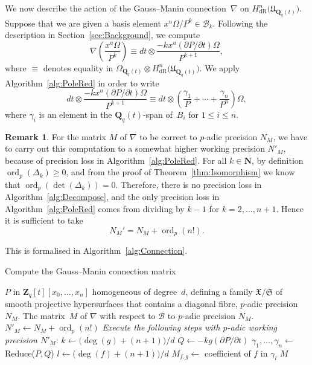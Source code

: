 \documentclass[a4paper,11pt]{article}
\numberwithin{equation}{section}
\newcommand{\NN}{\mathbf{N}} %
\newcommand{\ZZ}{\mathbf{Z}} %
\newcommand{\QQ}{\mathbf{Q}} %
\DeclareMathOperator{\ord}{ord}          %
\providecommand{\HdR}{H_{\text{dR}}}    %
\providecommand{\cB}{\mathcal{B}} %
\theoremstyle{definition}
\newtheorem{rem}[thm]{Remark}
\begin{document}
We now describe the action of the Gauss--Manin connection~$\nabla$ on 
$\HdR^n\bigl(\mathfrak{U}_{\QQ_q(t)}\bigr)$.  Suppose that we are given a basis element 
$x^u \Omega / P^k \in \cB_k$.  Following the description in 
Section~\ref{sec:Background}, we compute
\begin{equation} \label{eqn:nabla}
\nabla \left(\frac{x^u \Omega}{P^k}\right) \equiv 
    dt \otimes \frac{- k x^u (\partial P / \partial t) \Omega}{P^{k+1}},
\end{equation}
where $\equiv$ denotes equality in 
$\Omega_{\QQ_q(t)} \otimes \HdR^n\bigl(\mathfrak{U}_{\QQ_q(t)}\bigr)$. 
We apply Algorithm~\ref{alg:PoleRed} in order to write
\begin{equation}
dt \otimes \frac{- k x^u (\partial P / \partial t) \Omega}{P^{k+1}} \equiv 
dt \otimes \left( \frac{\gamma_{1}}{P} + \dotsb + \frac{\gamma_n}{P^n} \right) \Omega,
\end{equation}
where $\gamma_i$ is an element in the $\QQ_q(t)$-span of~$B_i$ for $1 \leq i \leq n$. 

\begin{rem} \label{rem:precgm}
For the matrix $M$ of $\nabla$ to be correct to $p$-adic precision $N_M$, we have to 
carry out this computation to a somewhat higher working precision $N'_M$, because of 
precision loss in Algorithm~\ref{alg:PoleRed}. 
For all $k \in \NN$, by definition $\ord_p(\Delta_k) \geq 0$, and from the proof
of Theorem~\ref{thm:Isomorphism} we know that $\ord_p(\det(\Delta_k))=0$. 
Therefore, there is no precision loss 
in Algorithm~\ref{alg:Decompose}, and the only precision loss in Algorithm~\ref{alg:PoleRed} 
comes from dividing by $k-1$ for $k=2,\dotsc,n+1$. Hence it is sufficient to take 
\begin{equation*}
N_M'=N_M + \ord_p(n!).
\end{equation*}
\end{rem}
This is formalised in Algorithm~\ref{alg:Connection}.

\begin{algorithm}
\caption{Compute the Gauss--Manin connection matrix}
\label{alg:Connection}
\begin{algorithmic}
\Require $P$ in $\ZZ_q[t][x_0, \dotsc, x_n]$ homogeneous of degree~$d$, 
         defining a family $\mathfrak{X}/\mathfrak{S}$ of smooth projective 
         hypersurfaces that contains a diagonal fibre, $p$-adic precision $N_M$.
\Ensure  The matrix~$M$ of $\nabla$ with respect to $\cB$ to $p$-adic precision $N_M$.
\State $N'_M \gets N_M + \ord_p(n!)$
\State \textit{Execute the following steps with $p$-adic working precision $N'_M$}:
\State $k \gets  \bigl(\deg(g)+(n+1)\bigr)/d$
\State $Q \gets  - k g (\partial P / \partial t)$
\State $\gamma_{1}, \dotsc, \gamma_n \gets$ {\sc Reduce($P,Q$)} 
\State $l \gets \bigl(\deg(f)+(n+1)\bigr)/d$
\State $M_{f,g} \gets$ coefficient of $f$ in $\gamma_l$
\EndFor
\EndFor
\Return $M$
\EndProcedure
\end{algorithmic}
\end{algorithm}
\end{document}

